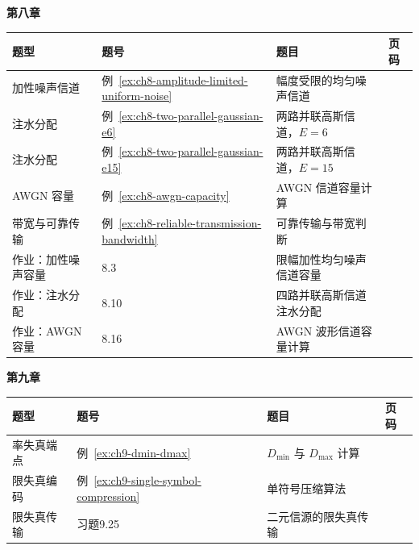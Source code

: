 {\noindent\textbf{第八章}\par
\begin{tabularx}{\textwidth}{@{}p{}p{}>{\raggedright\arraybackslash}X>{\raggedleft\arraybackslash}p{}@{}}
\toprule
\textbf{题型} & \textbf{题号} & \textbf{题目} & \textbf{页码} \\
\midrule
加性噪声信道 & 例~\ref{ex:ch8-amplitude-limited-uniform-noise} & 幅度受限的均匀噪声信道 & \hyperref[ex:ch8-amplitude-limited-uniform-noise]{\pageref*{ex:ch8-amplitude-limited-uniform-noise}}  \\
注水分配 & 例~\ref{ex:ch8-two-parallel-gaussian-e6} & 两路并联高斯信道，$E=6$ & \hyperref[ex:ch8-two-parallel-gaussian-e6]{\pageref*{ex:ch8-two-parallel-gaussian-e6}}  \\
注水分配 & 例~\ref{ex:ch8-two-parallel-gaussian-e15} & 两路并联高斯信道，$E=15$ & \hyperref[ex:ch8-two-parallel-gaussian-e15]{\pageref*{ex:ch8-two-parallel-gaussian-e15}}  \\
AWGN 容量 & 例~\ref{ex:ch8-awgn-capacity} & AWGN 信道容量计算 & \hyperref[ex:ch8-awgn-capacity]{\pageref*{ex:ch8-awgn-capacity}}  \\
带宽与可靠传输 & 例~\ref{ex:ch8-reliable-transmission-bandwidth} & 可靠传输与带宽判断 & \hyperref[ex:ch8-reliable-transmission-bandwidth]{\pageref*{ex:ch8-reliable-transmission-bandwidth}}  \\
作业：加性噪声容量 & 8.3 & 限幅加性均匀噪声信道容量 & \hyperref[hw:ch8-3-amplitude-limited-uniform-noise-capacity]{\pageref*{hw:ch8-3-amplitude-limited-uniform-noise-capacity}}  \\
作业：注水分配 & 8.10 & 四路并联高斯信道注水分配 & \hyperref[hw:ch8-10-parallel-gaussian-water-filling]{\pageref*{hw:ch8-10-parallel-gaussian-water-filling}}  \\
作业：AWGN 容量 & 8.16 & AWGN 波形信道容量计算 & \hyperref[hw:ch8-16-awgn-waveform-capacity]{\pageref*{hw:ch8-16-awgn-waveform-capacity}}  \\
\bottomrule
\end{tabularx}

\noindent\textbf{第九章}\par
\begin{tabularx}{\textwidth}{@{}p{}p{}>{\raggedright\arraybackslash}X>{\raggedleft\arraybackslash}p{}@{}}
\toprule
\textbf{题型} & \textbf{题号} & \textbf{题目} & \textbf{页码} \\
\midrule
率失真端点 & 例~\ref{ex:ch9-dmin-dmax} & $D_{\min}$ 与 $D_{\max}$ 计算 & \hyperref[ex:ch9-dmin-dmax]{\pageref*{ex:ch9-dmin-dmax}}  \\
限失真编码 & 例~\ref{ex:ch9-single-symbol-compression} & 单符号压缩算法 & \hyperref[ex:ch9-single-symbol-compression]{\pageref*{ex:ch9-single-symbol-compression}}  \\
限失真传输 & 习题9.25 & 二元信源的限失真传输 & \hyperref[ex:ch9-binary-source-distortion-transmission]{\pageref*{ex:ch9-binary-source-distortion-transmission}}  \\
\bottomrule
\end{tabularx}
}
